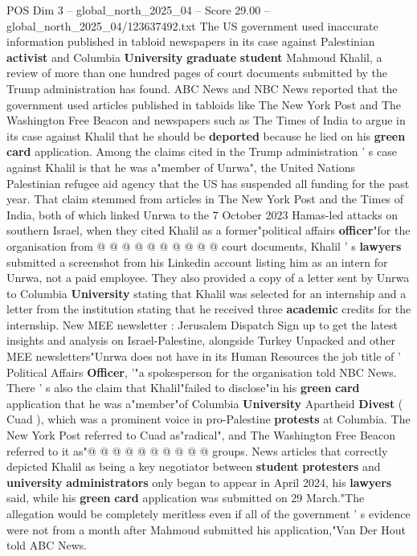 \begin{textsample}{POS Dim 3 – global\_north\_2025\_04 – Score 29.00 – global\_north\_2025\_04/123637492.txt}  \label{ex:f3_pos_046}
The US government used inaccurate information published in tabloid newspapers in its case against Palestinian \textbf{activist} and Columbia \textbf{University} \textbf{graduate} \textbf{student} Mahmoud Khalil, a review of more than one hundred pages of court documents submitted by the Trump administration has found.
ABC News and NBC News reported that the government used articles published in tabloids like The New York Post and The Washington Free Beacon and newspapers such as The Times of India to argue in its case against Khalil that he should be \textbf{deported} because he lied on his \textbf{green} \textbf{card} application.
Among the claims cited in the Trump administration ' s case against Khalil is that he was a"member of Unrwa", the United Nations Palestinian refugee aid agency that the US has suspended all funding for the past year.
That claim stemmed from articles in The New York Post and the Times of India, both of which linked Unrwa to the 7 October 2023 Hamas-led attacks on southern Israel, when they cited Khalil as a former"political affairs \textbf{officer}"for the organisation from @ @ @ @ @ @ @ @ @ @ court documents, Khalil ' s \textbf{lawyers} submitted a screenshot from his Linkedin account listing him as an intern for Unrwa, not a paid employee.
They also provided a copy of a letter sent by Unrwa to Columbia \textbf{University} stating that Khalil was selected for an internship and a letter from the institution stating that he received three \textbf{academic} credits for the internship.
New MEE newsletter : Jerusalem Dispatch Sign up to get the latest insights and analysis on Israel-Palestine, alongside Turkey Unpacked and other MEE newsletters"Unrwa does not have in its Human Resources the job title of ' Political Affairs \textbf{Officer}, '"a spokesperson for the organisation told NBC News.
There ' s also the claim that Khalil"failed to disclose"in his \textbf{green} \textbf{card} application that he was a"member"of Columbia \textbf{University} Apartheid \textbf{Divest} ( Cuad ), which was a prominent voice in pro-Palestine \textbf{protests} at Columbia.
The New York Post referred to Cuad as"radical", and The Washington Free Beacon referred to it as"@ @ @ @ @ @ @ @ @ @ groups.
News articles that correctly depicted Khalil as being a key negotiator between \textbf{student} \textbf{protesters} and \textbf{university} \textbf{administrators} only began to appear in April 2024, his \textbf{lawyers} said, while his \textbf{green} \textbf{card} application was submitted on 29 March."The allegation would be completely meritless even if all of the government ' s evidence were not from a month after Mahmoud submitted his application,"Van Der Hout told ABC News.

\end{textsample}
